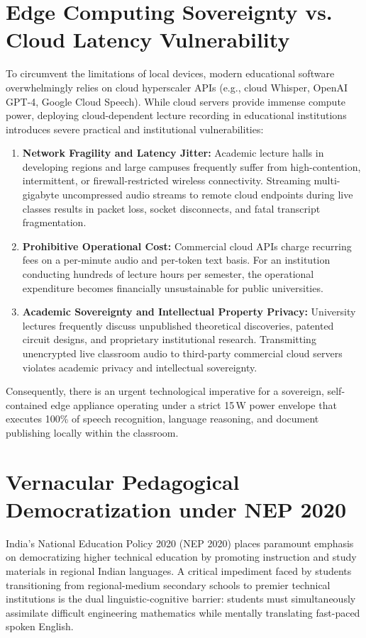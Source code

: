 \documentclass[11pt,a4paper,oneside]{report}
\begin{document}
\section{Edge Computing Sovereignty vs. Cloud Latency Vulnerability}
To circumvent the limitations of local devices, modern educational software overwhelmingly relies on cloud hyperscaler APIs (e.g., cloud Whisper, OpenAI GPT-4, Google Cloud Speech). While cloud servers provide immense compute power, deploying cloud-dependent lecture recording in educational institutions introduces severe practical and institutional vulnerabilities:
\begin{enumerate}[noitemsep]
    \item \textbf{Network Fragility and Latency Jitter:} Academic lecture halls in developing regions and large campuses frequently suffer from high-contention, intermittent, or firewall-restricted wireless connectivity. Streaming multi-gigabyte uncompressed audio streams to remote cloud endpoints during live classes results in packet loss, socket disconnects, and fatal transcript fragmentation.
    \item \textbf{Prohibitive Operational Cost:} Commercial cloud APIs charge recurring fees on a per-minute audio and per-token text basis. For an institution conducting hundreds of lecture hours per semester, the operational expenditure becomes financially unsustainable for public universities.
    \item \textbf{Academic Sovereignty and Intellectual Property Privacy:} University lectures frequently discuss unpublished theoretical discoveries, patented circuit designs, and proprietary institutional research. Transmitting unencrypted live classroom audio to third-party commercial cloud servers violates academic privacy and intellectual sovereignty.
\end{enumerate}
Consequently, there is an urgent technological imperative for a sovereign, self-contained edge appliance operating under a strict 15\,W power envelope that executes 100\% of speech recognition, language reasoning, and document publishing locally within the classroom.

\section{Vernacular Pedagogical Democratization under NEP 2020}
India's National Education Policy 2020 (NEP 2020) places paramount emphasis on democratizing higher technical education by promoting instruction and study materials in regional Indian languages. A critical impediment faced by students transitioning from regional-medium secondary schools to premier technical institutions is the dual linguistic-cognitive barrier: students must simultaneously assimilate difficult engineering mathematics while mentally translating fast-paced spoken English.
\end{document}
